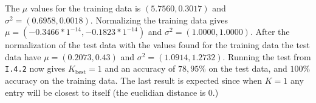 The $\mu$ values for the training data is $(5.7560, 0.3017)$ and $\sigma^2 =
(0.6958, 0.0018)$. Normalizing the training data gives $\mu = (-0.3466*1^{-14},
-0.1823*1^{-14})$ and $\sigma^2 = (1.0000, 1.0000)$. After the normalization of
the test data with the values found for the training data the test data have
$\mu = (0.2073, 0.43)$ and $\sigma^2 = (1.0914, 1.2732)$. Running the test from
\texttt{I.4.2} now gives $K_{\text{best}}=1$ and an accuracy of $78,95\%$ on the
test data, and $100\%$ accuracy on the training data. The last result is
expected since when $K=1$ any entry will be closest to itself (the euclidian
distance is 0.)


